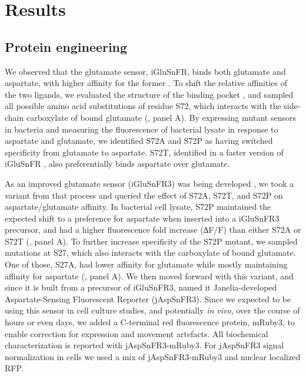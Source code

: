\documentclass[9pt,lineno]{elife}
\begin{document}
\section{Results}

\subsection{Protein engineering}
We observed that the glutamate sensor, iGluSnFR, binds both glutamate and aspartate, with higher affinity for the former \citep{Marvin2013-qq}.
To shift the relative affinities of the two ligands, we evaluated the structure of the binding pocket  \citep{Hu2008-nd}, and sampled all possible amino acid substitutions of residue S72, which interacts with the side-chain carboxylate of bound glutamate (, panel A).
By expressing mutant sensors in bacteria and measuring the fluorescence of bacterial lysate in response to aspartate and glutamate, we identified S72A and S72P as having switched specificity from glutamate to aspartate.
S72T, identified in a faster version of iGluSnFR \citep{Helassa2018-fb}, also preferentially binds aspartate over glutamate.

As an improved glutamate sensor (iGluSnFR3) was being developed \citep{Aggarwal2023-pi}, we took a variant from that process and queried the effect of S72A, S72T, and S72P on aspartate/glutamate affinity.
In bacterial cell lysate, S72P maintained the expected shift to a preference for aspartate when inserted into a iGluSnFR3 precursor, and had a higher fluorescence fold increase (∆F/F) than either S72A or S72T (, panel A).
To further increase specificity of the S72P mutant, we sampled mutations at S27, which also interacts with the carboxylate of bound glutamate.
One of those, S27A, had lower affinity for glutamate while mostly maintaining affinity for aspartate (, panel A).
We then moved forward with this variant, and since it is built from a precursor of iGluSnFR3, named it Janelia-developed Aspartate-Sensing Fluorescent Reporter (jAspSnFR3).
Since we expected to be using this sensor in cell culture studies, and potentially \textit{in vivo}, over the course of hours or even days, we added a C-terminal red fluorescence protein, mRuby3, to enable correction for expression and movement artefacts.
All biochemical characterization is reported with jAspSnFR3-mRuby3.
For jAspSnFR3 signal normalization in cells we used a mix of jAspSnFR3-mRuby3 and nuclear localized RFP.
\end{document}
